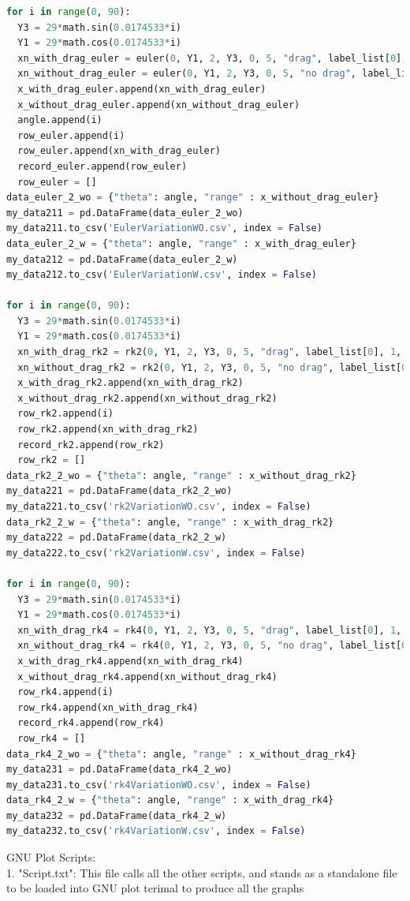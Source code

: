 \documentclass[12pt]{article}
\begin{document}
\begin{lstlisting}[language=Python, caption=Python code]
for i in range(0, 90):
  Y3 = 29*math.sin(0.0174533*i)
  Y1 = 29*math.cos(0.0174533*i)
  xn_with_drag_euler = euler(0, Y1, 2, Y3, 0, 5, "drag", label_list[0], 1, 'does not matter')
  xn_without_drag_euler = euler(0, Y1, 2, Y3, 0, 5, "no drag", label_list[0], 1, 'does not matter')
  x_with_drag_euler.append(xn_with_drag_euler)
  x_without_drag_euler.append(xn_without_drag_euler)
  angle.append(i)
  row_euler.append(i)
  row_euler.append(xn_with_drag_euler)
  record_euler.append(row_euler)
  row_euler = []
data_euler_2_wo = {"theta": angle, "range" : x_without_drag_euler}
my_data211 = pd.DataFrame(data_euler_2_wo)
my_data211.to_csv('EulerVariationWO.csv', index = False)
data_euler_2_w = {"theta": angle, "range" : x_with_drag_euler}
my_data212 = pd.DataFrame(data_euler_2_w)
my_data212.to_csv('EulerVariationW.csv', index = False)

for i in range(0, 90):
  Y3 = 29*math.sin(0.0174533*i)
  Y1 = 29*math.cos(0.0174533*i)
  xn_with_drag_rk2 = rk2(0, Y1, 2, Y3, 0, 5, "drag", label_list[0], 1, 'does not matter')
  xn_without_drag_rk2 = rk2(0, Y1, 2, Y3, 0, 5, "no drag", label_list[0], 1, 'does not matter')
  x_with_drag_rk2.append(xn_with_drag_rk2)
  x_without_drag_rk2.append(xn_without_drag_rk2)
  row_rk2.append(i)
  row_rk2.append(xn_with_drag_rk2)
  record_rk2.append(row_rk2)
  row_rk2 = []
data_rk2_2_wo = {"theta": angle, "range" : x_without_drag_rk2}
my_data221 = pd.DataFrame(data_rk2_2_wo)
my_data221.to_csv('rk2VariationWO.csv', index = False)
data_rk2_2_w = {"theta": angle, "range" : x_with_drag_rk2}
my_data222 = pd.DataFrame(data_rk2_2_w)
my_data222.to_csv('rk2VariationW.csv', index = False)

for i in range(0, 90):
  Y3 = 29*math.sin(0.0174533*i)
  Y1 = 29*math.cos(0.0174533*i)
  xn_with_drag_rk4 = rk4(0, Y1, 2, Y3, 0, 5, "drag", label_list[0], 1, 'does not matter')
  xn_without_drag_rk4 = rk4(0, Y1, 2, Y3, 0, 5, "no drag", label_list[0], 1, 'does not matter')
  x_with_drag_rk4.append(xn_with_drag_rk4)
  x_without_drag_rk4.append(xn_without_drag_rk4)
  row_rk4.append(i)
  row_rk4.append(xn_with_drag_rk4)
  record_rk4.append(row_rk4)
  row_rk4 = []
data_rk4_2_wo = {"theta": angle, "range" : x_without_drag_rk4}
my_data231 = pd.DataFrame(data_rk4_2_wo)
my_data231.to_csv('rk4VariationWO.csv', index = False)
data_rk4_2_w = {"theta": angle, "range" : x_with_drag_rk4}
my_data232 = pd.DataFrame(data_rk4_2_w)
my_data232.to_csv('rk4VariationW.csv', index = False)
\end{lstlisting}
\newpage 
GNU Plot Scripts:\\
1. "Script.txt": This file calls all the other scripts, and stands as a standalone file to be loaded into GNU plot terimal to produce all the graphs
\end{document}
